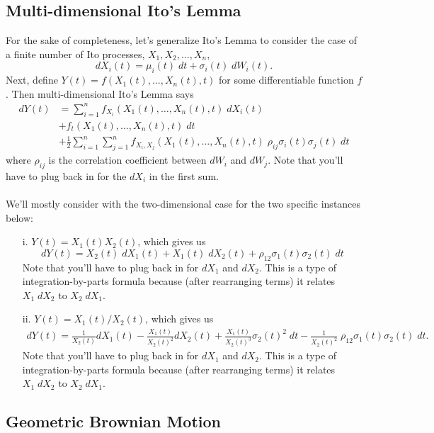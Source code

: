 \documentclass[a4paper,12pt]{scrartcl}
\begin{document}
\subsection{Multi-dimensional Ito's Lemma}

For the sake of completeness, let's generalize Ito's Lemma to consider
the case of a finite number of Ito processes, $X_1, X_2, \ldots, X_n$,
   \[ dX_i(t) = \mu_i(t)\; dt + \sigma_i(t) \; dW_i(t).\]
Next, define $Y(t) = f(X_1(t), \ldots, X_n(t), t)$ for some 
differentiable function $f$.  Then multi-dimensional Ito's Lemma says
\begin{align*}
    dY(t) &= \sum^n_{i=1} f_{X_i}(X_1(t), \ldots, X_n(t), t) \; 
      dX_i(t) \\
    &+ f_{t}(X_1(t), \ldots, X_n(t), t) \; dt \\
    &+ \frac{1}{2} \sum^n_{i=1}\sum^n_{j=1} 
      f_{X_i,X_j}(X_1(t), \ldots, X_n(t), t) \; \rho_{ij}\sigma_i(t)
      \sigma_j(t) \; dt 
\end{align*}
where $\rho_{ij}$ is the correlation coefficient between $dW_i$ and
$dW_j$. Note that you'll have to plug back in for the $dX_i$ in the
first sum.
\\
\\
We'll mostly consider with the two-dimensional case for the 
two specific instances below:
\begin{itemize}
   \item[i.]{$Y(t) = X_1(t)X_2(t)$, which gives us
      \[ dY(t) = X_2(t) \; dX_1(t) + X_1(t) \; dX_2(t) +
	 \rho_{12}\sigma_1(t)\sigma_2(t) \; dt \]
      Note that you'll have to plug back in for $dX_1$ and $dX_2$.
      This is a type of integration-by-parts formula because (after
      rearranging terms) it relates $X_1\; dX_2$ to $X_2\; dX_1$.
   }

   \item[ii.]{$Y(t) = X_1(t)/X_2(t)$, which gives us
      \begin{align*}
	 dY(t) = \frac{1}{X_2(t)} dX_1(t) - \frac{X_1(t)}{X_2(t)^2}
	 dX_2(t) +  \frac{X_1(t)}{X_2(t)^3} \sigma_2(t)^2 \;dt -
	 \frac{1}{X_2(t)^2} \; \rho_{12}\sigma_1(t)\sigma_2(t) \; dt. 
      \end{align*}
      Note that you'll have to plug back in for $dX_1$ and $dX_2$.
      This is a type of integration-by-parts formula because (after
      rearranging terms) it relates $X_1\; dX_2$ to $X_2\; dX_1$.
      }
\end{itemize}


\subsection{Geometric Brownian Motion}
\end{document}
